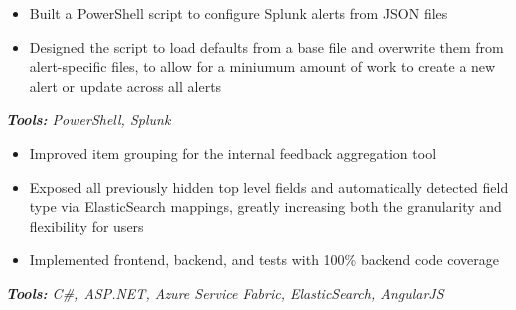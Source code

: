 \documentclass[10pt,letter]{altacv}
\begin{document}

\begin{fullwidth}
\marginpar{\makesidebarheader}
    \vspace*{-1\baselineskip}
\makecvheader
\end{fullwidth}


\begin{itemize}
  \item Built a PowerShell script to configure Splunk alerts from JSON files
  \item Designed the script to load defaults from a base file and overwrite them from alert-specific files, to allow for a miniumum amount of work to create a new alert or update across all alerts
\end{itemize}
\textit{\textbf{Tools:} PowerShell, Splunk}

\divider

\begin{itemize}
\item Improved item grouping for the internal feedback aggregation tool
\item Exposed all previously hidden top level fields and automatically detected field type via ElasticSearch mappings, greatly increasing both the granularity and flexibility for users
\item Implemented frontend, backend, and tests with 100\% backend code coverage
\end{itemize}
\textit{\textbf{Tools:} C\#, ASP.NET, Azure Service Fabric, ElasticSearch, AngularJS}
\end{document}
